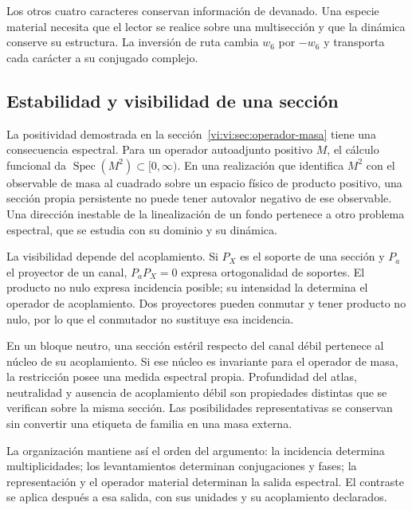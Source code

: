 Los otros cuatro caracteres conservan información de devanado.
Una especie material necesita que el lector se realice sobre una
multisección y que la dinámica conserve su estructura. La inversión
de ruta cambia $w_6$ por $-w_6$ y transporta cada carácter a su
conjugado complejo.

\subsection{Estabilidad y visibilidad de una sección}

La positividad demostrada en la
sección~\ref{vi:vi:sec:operador-masa} tiene una consecuencia espectral.
Para un operador autoadjunto positivo $M$, el cálculo funcional da
$\operatorname{Spec}(M^2)\subset[0,\infty)$. En una realización que
identifica $M^2$ con el observable de masa al cuadrado sobre un
espacio físico de producto positivo, una sección propia persistente
no puede tener autovalor negativo de ese observable. Una dirección
inestable de la linealización de un fondo pertenece a otro problema
espectral, que se estudia con su dominio y su dinámica.

La visibilidad depende del acoplamiento. Si $P_X$ es el soporte de
una sección y $P_a$ el proyector de un canal, $P_aP_X=0$ expresa
ortogonalidad de soportes. El producto no nulo expresa incidencia
posible; su intensidad la determina el operador de acoplamiento.
Dos proyectores pueden conmutar y tener producto no nulo, por lo
que el conmutador no sustituye esa incidencia.

En un bloque neutro, una sección estéril respecto del canal débil
pertenece al núcleo de su acoplamiento. Si ese núcleo es invariante
para el operador de masa, la restricción posee una medida espectral
propia. Profundidad del atlas, neutralidad y ausencia de acoplamiento
débil son propiedades distintas que se verifican sobre la misma
sección. Las posibilidades representativas se conservan sin
convertir una etiqueta de familia en una masa externa.

La organización mantiene así el orden del argumento: la incidencia
determina multiplicidades; los levantamientos determinan
conjugaciones y fases; la representación y el operador material
determinan la salida espectral. El contraste se aplica después a
esa salida, con sus unidades y su acoplamiento declarados.
